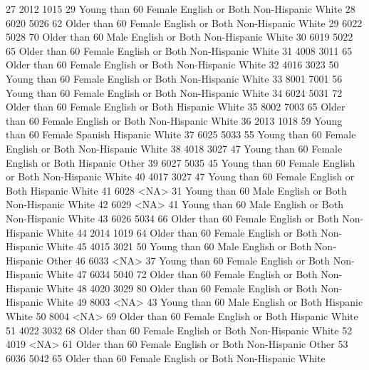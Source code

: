 \documentclass[
  letterpaper,
  DIV=11,
  numbers=noendperiod]{scrreprt}
\newenvironment{Shaded}{\begin{snugshade}}{\end{snugshade}}
\newcommand{\NormalTok}[1]{\textcolor[rgb]{0.00,0.23,0.31}{#1}}
\begin{document}
\begin{Shaded}
\begin{Highlighting}[]
\NormalTok{27  2012 1015  29 Young than 60 Female English or Both Non{-}Hispanic      White}
\NormalTok{28  6020 5026  62 Older than 60 Female English or Both Non{-}Hispanic      White}
\NormalTok{29  6022 5028  70 Older than 60   Male English or Both Non{-}Hispanic      White}
\NormalTok{30  6019 5022  65 Older than 60 Female English or Both Non{-}Hispanic      White}
\NormalTok{31  4008 3011  65 Older than 60 Female English or Both Non{-}Hispanic      White}
\NormalTok{32  4016 3023  50 Young than 60 Female English or Both Non{-}Hispanic      White}
\NormalTok{33  8001 7001  56 Young than 60 Female English or Both Non{-}Hispanic      White}
\NormalTok{34  6024 5031  72 Older than 60 Female English or Both     Hispanic      White}
\NormalTok{35  8002 7003  65 Older than 60 Female English or Both Non{-}Hispanic      White}
\NormalTok{36  2013 1018  59 Young than 60 Female         Spanish     Hispanic      White}
\NormalTok{37  6025 5033  55 Young than 60 Female English or Both Non{-}Hispanic      White}
\NormalTok{38  4018 3027  47 Young than 60 Female English or Both     Hispanic      Other}
\NormalTok{39  6027 5035  45 Young than 60 Female English or Both Non{-}Hispanic      White}
\NormalTok{40  4017 3027  47 Young than 60 Female English or Both     Hispanic      White}
\NormalTok{41  6028 \textless{}NA\textgreater{}  31 Young than 60   Male English or Both Non{-}Hispanic      White}
\NormalTok{42  6029 \textless{}NA\textgreater{}  41 Young than 60   Male English or Both Non{-}Hispanic      White}
\NormalTok{43  6026 5034  66 Older than 60 Female English or Both Non{-}Hispanic      White}
\NormalTok{44  2014 1019  64 Older than 60 Female English or Both Non{-}Hispanic      White}
\NormalTok{45  4015 3021  50 Young than 60   Male English or Both Non{-}Hispanic      Other}
\NormalTok{46  6033 \textless{}NA\textgreater{}  37 Young than 60 Female English or Both Non{-}Hispanic      White}
\NormalTok{47  6034 5040  72 Older than 60 Female English or Both Non{-}Hispanic      White}
\NormalTok{48  4020 3029  80 Older than 60 Female English or Both Non{-}Hispanic      White}
\NormalTok{49  8003 \textless{}NA\textgreater{}  43 Young than 60   Male English or Both     Hispanic      White}
\NormalTok{50  8004 \textless{}NA\textgreater{}  69 Older than 60 Female English or Both     Hispanic      White}
\NormalTok{51  4022 3032  68 Older than 60 Female English or Both Non{-}Hispanic      White}
\NormalTok{52  4019 \textless{}NA\textgreater{}  61 Older than 60 Female English or Both Non{-}Hispanic      Other}
\NormalTok{53  6036 5042  65 Older than 60 Female English or Both Non{-}Hispanic      White}

\end{Highlighting}
\end{Shaded}
\end{document}
